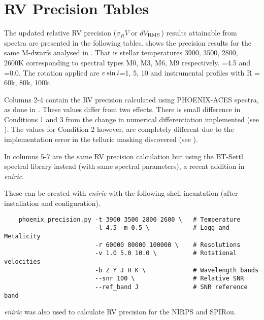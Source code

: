 
\chapter{RV Precision Tables} %

\label{app:nir_prec_amendment}

The updated relative RV precision ($\sigma_RV$ or $dV_{\textrm{RMS}}$) results attainable from \nir{} spectra are presented in the following tables.  shows the precision results for the same M-dwarfs analysed in \citep{figueira_radial_2016}.
That is stellar temperatures 3900, 3500, 2800, 2600K corresponding to spectral types M0, M3, M6, M9 respectively. \logg{}=4.5 and \feh{}=0.0. The rotation applied are $v\sin{i}{}$=1, 5, 10\kmps{} and instrumental profiles with R = 60k, 80k, 100k.

Columns 2-4 contain the RV precision calculated using {PHOENIX-ACES} spectra, as done in \citet{figueira_radial_2016}. These values differ from two effects. There is small difference in Conditions 1 and 3 from the change in numerical differentiation implemented (see ). The values for Condition 2 however, are completely different due to the implementation error in the telluric masking discovered (see ). 

In columns 5-7 are the same RV precision calculation but using the {BT-Settl} spectral library instead (with same spectral parameters), a recent addition in \emph{eniric}.


These can be created with \emph{eniric} with the following shell incantation (after installation and configuration).


\begin{lstlisting}
    phoenix_precision.py -t 3900 3500 2800 2600 \   # Temperature
                         -l 4.5 -m 0.5 \            # Logg and Metalicity
                         -r 60000 80000 100000 \    # Resolutions
                         -v 1.0 5.0 10.0 \          # Rotational velocities
                         -b Z Y J H K \             # Wavelength bands
                         --snr 100 \                # Relative SNR
                         --ref_band J               # SNR reference band
\end{lstlisting}


\emph{eniric} was also used to calculate {RV} precision for the {NIRPS} and {SPIRou}. 

